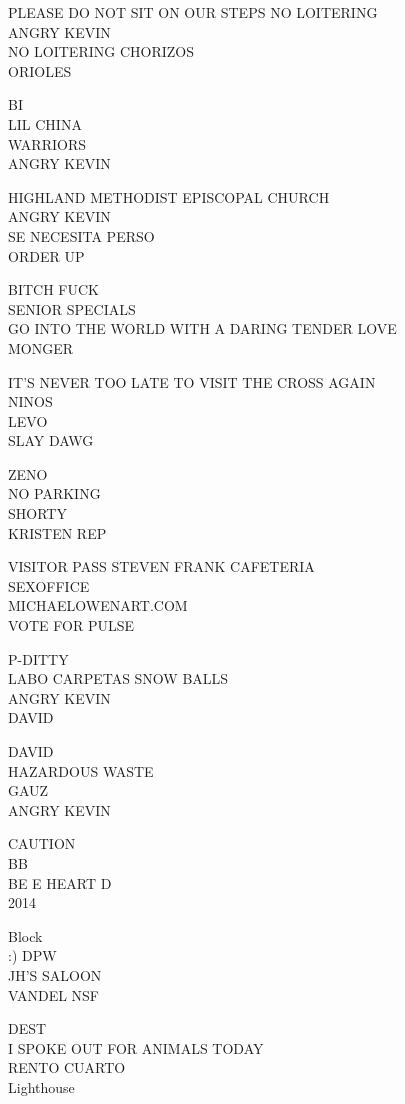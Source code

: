 \documentclass[10pt,letterpaper]{article}
\begin{document}
PLEASE DO NOT SIT ON OUR STEPS NO LOITERING\\
ANGRY KEVIN\\
NO LOITERING CHORIZOS\\
ORIOLES

BI\\
LIL CHINA\\
WARRIORS\\
ANGRY KEVIN

HIGHLAND METHODIST EPISCOPAL CHURCH\\
ANGRY KEVIN\\
SE NECESITA PERSO\\
ORDER UP

BITCH FUCK\\
SENIOR SPECIALS\\
GO INTO THE WORLD WITH A DARING TENDER LOVE\\
MONGER

IT'S NEVER TOO LATE TO VISIT THE CROSS AGAIN\\
NINOS\\
LEVO\\
SLAY DAWG

ZENO\\
NO PARKING\\
SHORTY\\
KRISTEN REP

VISITOR PASS STEVEN FRANK CAFETERIA\\
SEXOFFICE\\
MICHAELOWENART.COM\\
VOTE FOR PULSE

P{-}DITTY\\
LABO CARPETAS SNOW BALLS\\
ANGRY KEVIN\\
DAVID

DAVID\\
HAZARDOUS WASTE\\
GAUZ\\
ANGRY KEVIN

CAUTION\\
BB\\
BE E HEART D\\
2014

Block\\
:) DPW\\
JH'S SALOON\\
VANDEL NSF

DEST\\
I SPOKE OUT FOR ANIMALS TODAY\\
RENTO CUARTO\\
Lighthouse
\end{document}
